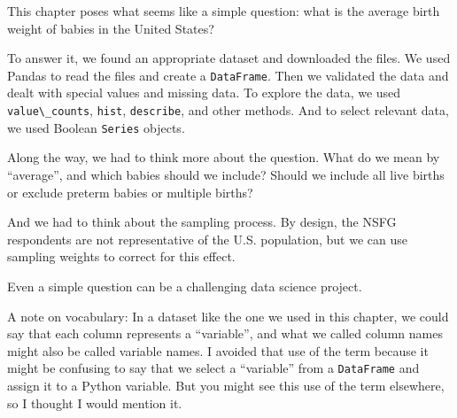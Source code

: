 This chapter poses what seems like a simple question: what is the
average birth weight of babies in the United States?

To answer it, we found an appropriate dataset and downloaded the files.
We used Pandas to read the files and create a
\passthrough{\lstinline!DataFrame!}. Then we validated the data and
dealt with special values and missing data. To explore the data, we used
\passthrough{\lstinline!value\_counts!}, \passthrough{\lstinline!hist!},
\passthrough{\lstinline!describe!}, and other methods. And to select
relevant data, we used Boolean \passthrough{\lstinline!Series!} objects.

Along the way, we had to think more about the question. What do we mean
by ``average'', and which babies should we include? Should we include
all live births or exclude preterm babies or multiple births?

And we had to think about the sampling process. By design, the NSFG
respondents are not representative of the U.S. population, but we can
use sampling weights to correct for this effect.

Even a simple question can be a challenging data science project.

A note on vocabulary: In a dataset like the one we used in this chapter,
we could say that each column represents a ``variable'', and what we
called column names might also be called variable names. I avoided that
use of the term because it might be confusing to say that we select a
``variable'' from a \passthrough{\lstinline!DataFrame!} and assign it to
a Python variable. But you might see this use of the term elsewhere, so
I thought I would mention it.

